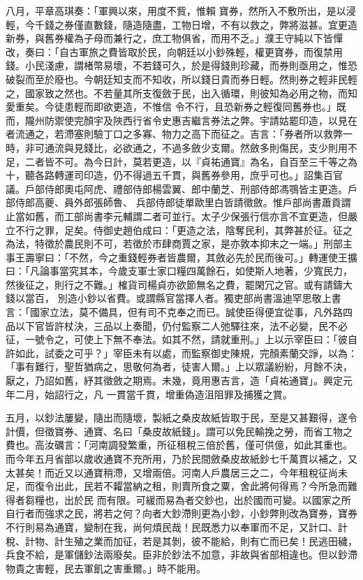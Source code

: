 \begin{pinyinscope}
 八月，平章高琪奏：「軍興以來，用度不貲，惟賴
 寶券，然所入不敷所出，是以浸輕，今千錢之券僅直數錢，隨造隨盡，工物日增，不有以救之，弊將滋甚。宜更造新券，與舊券權為子母而兼行之，庶工物俱省，而用不乏。」濮王守純以下皆憚改，奏曰：「自古軍旅之費皆取於民，向朝廷以小鈔殊輕，權更寶券，而復禁用錢。小民淺慮，謂楮幣易壞，不若錢可久，於是得錢則珍藏，而券則亟用之，惟恐破裂而至於廢也。今朝廷知支而不知收，所以錢日貴而券日輕。然則券之輕非民輕之，國家致之然也。不若量其所支復斂于民，出入循環，則彼知為必用之物，而知愛重矣。今徒患輕而即欲更造，不惟信
 令不行，且恐新券之輕復同舊券也。」既而，隴州防禦使完顏宇及陜西行省令史惠吉繼言券法之弊。宇請姑罷印造，以見在者流通之，若滯塞則驗丁口之多寡、物力之高下而征之。吉言：「券者所以救弊一時，非可通流與見錢比，必欲通之，不過多斂少支爾。然斂多則傷民，支少則用不足，二者皆不可。為今日計，莫若更造，以『貞祐通寶』為名，自百至三千等之為十，聽各路轉運司印造，仍不得過五千貫，與舊券參用，庶乎可也。」詔集百官議。戶部侍郎奧屯阿虎、禮部侍郎楊雲翼、郎中蘭芝、刑部侍郎馮鶚皆主更造。戶部侍郎高夔、員外郎張師魯、
 兵部侍郎徒單歐里白皆請徵斂。惟戶部尚書蕭貢謂止當如舊，而工部尚書李元輔謂二者可並行。太子少保張行信亦言不宜更造，但嚴立不行之罪，足矣。侍御史趙伯成曰：「更造之法，陰奪民利，其弊甚於征。征之為法，特徵於農民則不可，若徵於市肆商賈之家，是亦敦本抑末之一端。」刑部主事王壽寧曰：「不然，今之重錢輕券者皆農爾，其斂必先於民而後可。」轉運使王擴曰：「凡論事當究其本，今歲支軍士家口糧四萬餘石，如使斯人地著，少寬民力，然後征之，則行之不難。」榷貨司楊貞亦欲節無名之費，罷閑冗之官。或有請鑄大錢以當百，
 別造小鈔以省費。或謂縣官當擇人者。獨吏部尚書溫迪罕思敬上書言：「國家立法，莫不備具，但有司不克奉之而已。誠使臣得便宜從事，凡外路四品以下官皆許杖決，三品以上奏聞，仍付監察二人弛驛往來，法不必變，民不必征，一號令之，可使上下無不奉法。如其不然，請就重刑。」上以示宰臣曰：「彼自許如此，試委之可乎？」宰臣未有以處，而監察御史陳規，完顏素蘭交諍，以為：「事有難行，聖哲猶病之，思敬何為者，徒害人爾。」上以眾議紛紛，月餘不決，厭之，乃詔如舊，紓其徵斂之期焉。未幾，竟用惠吉言，造「貞祐通寶」。興定元年二月，始詔行之，凡
 一貫當千貫，增重偽造沮阻罪及捕獲之賞。



 五月，以鈔法屢變，隨出而隨壞，製紙之桑皮故紙皆取于民，至是又甚艱得，遂令計價，但徵寶券、通寶、名曰「桑皮故紙錢」。謂可以免民輸挽之勞，而省工物之費也。高汝礪言：「河南調發繁重，所征租稅三倍於舊，僅可供億，如此其重也。而今年五月省部以歲收通寶不充所用，乃於民間斂桑皮故紙鈔七千萬貫以補之，又太甚矣！而近又以通寶稍滯，又增兩倍。河南人戶農居三之二，今年租稅征尚未足，而復令出此，民若不糶當納之租，則賣所食之粟，舍此將何得焉？今所急而難得者芻糧也，出於民
 而有限。可緩而易為者交鈔也，出於國而可變。以國家之所自行者而強求之民，將若之何？向者大鈔滯則更為小鈔，小鈔弊則改為寶券，寶券不行則易為通寶，變制在我，尚何煩民哉！民既悉力以奉軍而不足，又計口、計稅、計物、計生殖之業而加征，若是其剝，彼不能給，則有亡而已矣！民逃田穢，兵食不給，是軍儲鈔法兩廢矣。臣非於鈔法不加意，非故與省部相違也。但以鈔滯物貴之害輕，民去軍飢之害重爾。」時不能用。




\end{pinyinscope}
